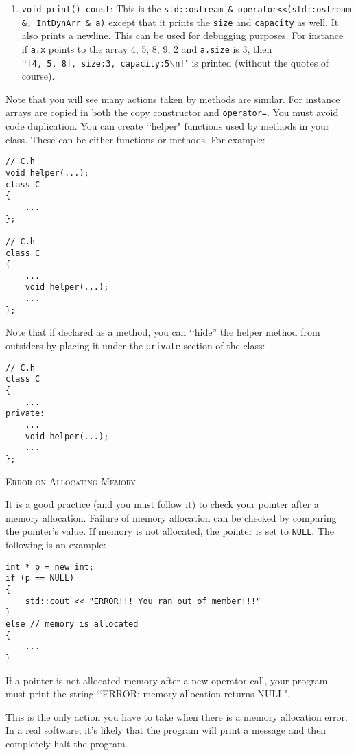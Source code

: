 \begin{enumerate}
\item \verb!void print() const!: This is the 
\texttt{std::ostream \& operator<<(std::ostream \&, IntDynArr \& a)} except that 
it prints the \verb!size! and \verb!capacity! as well. It also prints a newline. 
This can be used for debugging purposes. For instance if \verb!a.x! points to 
the array 4, 5, 8, 9, 2 and \verb!a.size! is 3, then
\lq\lq \texttt{[4,\ 5,\ 8],\ size:3,\ capacity:5$\backslash$n!}" is printed (without the quotes of 
course).

\end{enumerate}

Note that you will see many actions taken by methods are similar. For instance 
arrays are copied in both the copy constructor and \verb!operator=!. You must 
avoid code duplication. You can create \lq\lq helper" functions used by methods in 
your class. These can be either functions or methods. For example:
\begin{Verbatim}[frame=single]
// C.h
void helper(...);
class C
{
    ...
};

// C.h
class C
{
    ...
    void helper(...);
    ...
};
\end{Verbatim}

Note that if declared as a method, you can \lq\lq hide” the helper method 
from outsiders by placing it under the \verb!private! section of the class:

\begin{Verbatim}[frame=single]
// C.h
class C
{
    ...
private:
    ...
    void helper(...);
    ...
};
\end{Verbatim}

\newpage
\textsc{Error on Allocating Memory}

It is a good practice (and you must follow it) to check your pointer after a 
memory allocation.  Failure of memory allocation can be checked by comparing 
the pointer's value. If memory is not allocated, the pointer is set to 
\verb!NULL!. The following is an example:

\begin{Verbatim}[frame=single]
int * p = new int;
if (p == NULL)
{
    std::cout << "ERROR!!! You ran out of member!!!"
}
else // memory is allocated
{
    ...
}
\end{Verbatim}

If a pointer is not allocated memory after a new operator call, your program 
must print the string \lq\lq ERROR: memory allocation returns NULL".

This is the only action you have to take when there is a memory allocation 
error. In a real software, it's likely that the program will print a message 
and then completely halt the program. 

